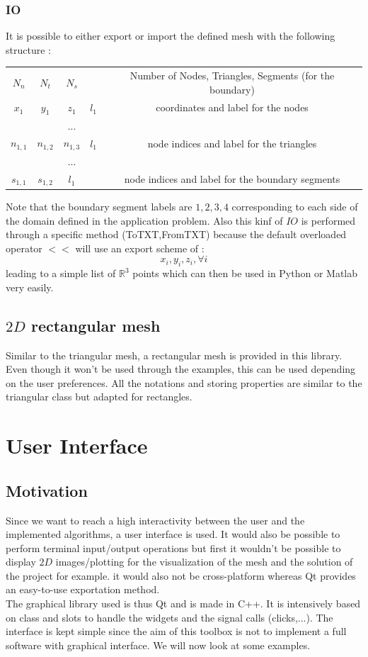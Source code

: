 \documentclass[a4paper]{report}
\begin{document}
\subsection{IO}
It is possible to either export or import the defined mesh with the following structure :
\\
\begin{tabular}{c c c c c}
$N_n$ & $N_t$ & $N_s$ & &Number of Nodes, Triangles, Segments (for the boundary)\\
$x_1$ &$y_1$ &$z_1$ & $l_1$ & coordinates and label for the nodes\\
&&...&&\\
$n_{1,1}$&$n_{1,2}$&$n_{1,3}$&$l_1$& node indices and label for the triangles\\
&& ... &&\\
$s_{1,1}$&$s_{1,2}$&$l_1$&&node indices and label for the boundary segments
\end{tabular}
Note that the boundary segment labels are $1,2,3,4$ corresponding to each side of the domain defined in the application problem. Also this kinf of $IO$ is performed through a specific method (ToTXT,FromTXT) because the default overloaded operator $<<$ will use an export scheme of :
\[
x_i,y_i,z_i,\forall i
\]
leading to a simple list of $\mathbb{R}^3$ points which can then be used in Python or Matlab very easily.
\section{$2D$ rectangular mesh}
Similar to the triangular mesh, a rectangular mesh is provided in this library. Even though it won't be used through the examples, this can be used depending on the user preferences.
All the notations and storing properties are similar to the triangular class but adapted for rectangles.
\chapter{User Interface}
\section{Motivation}
Since we want to reach a high interactivity between the user and the implemented algorithms, a user interface is used. It would also be possible to perform terminal input/output operations but first it wouldn't be possible to display $2D$ images/plotting for the visualization of the mesh and the solution of the project for example. it would also not be cross-platform whereas Qt provides an easy-to-use exportation method.
\\
The graphical library used is thus Qt and is made in C++. It is intensively based on class and slots to handle the widgets and the signal calls (clicks,...). The interface is kept simple since the aim of this toolbox is not to implement a full software with graphical interface. We will now look at some examples.
\end{document}

